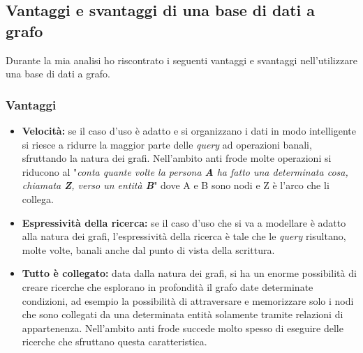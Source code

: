 \subsection{Vantaggi e svantaggi di una base di dati a grafo}
Durante la mia analisi ho riscontrato i seguenti vantaggi e svantaggi nell'utilizzare una base di dati a grafo.
\subsubsection{Vantaggi}
\begin{itemize}
\item{\textbf{Velocità:}} se il caso d'uso è adatto e si organizzano i dati in modo intelligente si riesce a ridurre la maggior parte delle \textit{query} ad operazioni banali, sfruttando la natura dei grafi. Nell'ambito anti frode molte operazioni si riducono al "\textit{conta quante volte la persona \textbf{A} ha fatto una determinata cosa, chiamata \textbf{Z}, verso un entità \textbf{B}}" dove A e B sono nodi e Z è l'arco che li collega.
\item{\textbf{Espressività della ricerca:}} se il caso d'uso che si va a modellare è adatto alla natura dei grafi, l'espressività della ricerca è tale che le \textit{query} risultano, molte volte, banali anche dal punto di vista della scrittura.
\item{\textbf{Tutto è collegato:}} data dalla natura dei grafi, si ha un enorme possibilità di creare ricerche che esplorano in profondità il grafo date determinate condizioni, ad esempio la possibilità di attraversare e memorizzare solo i nodi che sono collegati da una determinata entità solamente tramite relazioni di appartenenza. Nell'ambito anti frode succede molto spesso di eseguire delle ricerche che sfruttano questa caratteristica.
\end{itemize}
